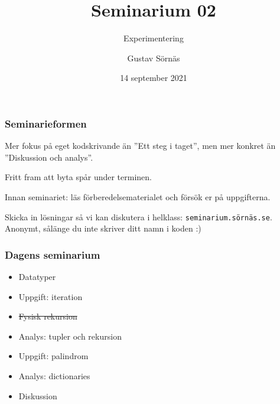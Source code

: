 \documentclass{beamer}
\title{Seminarium 02}
\subtitle{Experimentering}
\date{14 september 2021}
\author{Gustav Sörnäs}
\begin{document}
  \frame{\titlepage}

  \begin{frame}
    \frametitle{Seminarieformen}

    Mer fokus på eget kodskrivande än ''Ett steg i taget'', men mer konkret än
    ''Diskussion och analys''.

    Fritt fram att byta spår under terminen.

    Innan seminariet: läs förberedelsematerialet och försök er på uppgifterna.

    Skicka in lösningar så vi kan diskutera i helklass:
    \texttt{seminarium.sörnäs.se}. Anonymt, sålänge du inte skriver ditt namn i
    koden :)

  \end{frame}

  \begin{frame}
    \frametitle{Dagens seminarium}

    \begin{itemize}
      \item Datatyper
      \item Uppgift: iteration
      \item \sout{Fysisk rekursion}
      \item Analys: tupler och rekursion
      \item Uppgift: palindrom
      \item Analys: dictionaries
      \item Diskussion
    \end{itemize}

  \end{frame}
\end{document}
